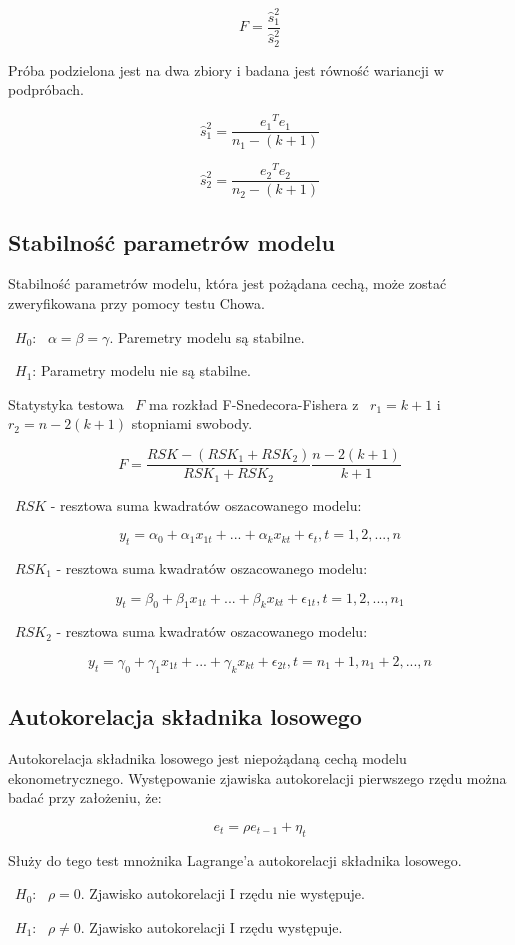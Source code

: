 \documentclass{article}
\begin{document}
\[F = \frac{\hat{s}_1^2}{\hat{s}_2^2}\]

Próba podzielona jest na dwa zbiory i badana jest równość wariancji w podpróbach.

\[\hat{s}_1^2 = \frac{{e_1}^T{e_1}}{n_1-(k+1)}\]

\[\hat{s}_2^2 = \frac{{e_2}^T{e_2}}{n_2-(k+1)}\]

\newpage
\subsection{Stabilność parametrów modelu}
Stabilność parametrów modelu, która jest pożądana cechą, może zostać zweryfikowana przy pomocy testu Chowa.

~$H_0$: ~$\alpha = \beta = \gamma$. Paremetry modelu są stabilne.

~$H_1$: Parametry modelu nie są stabilne.

Statystyka testowa ~$F$ ma rozkład F-Snedecora-Fishera z ~$r_1 = k+1$ i ~$r_2 = n - 2(k + 1)$ stopniami swobody.

\[F = \frac{RSK - (RSK_1 + RSK_2)}{RSK_1 + RSK_2}\frac{n - 2(k+1)}{k + 1}\]

~$RSK$ - resztowa suma kwadratów oszacowanego modelu:

\[y_t = \alpha_0 + \alpha_1x_{1t}+...+\alpha_kx_{kt}+\epsilon_t,t=1,2,...,n\]

~$RSK_1$ - resztowa suma kwadratów oszacowanego modelu:

\[y_t = \beta_0 + \beta_1x_{1t}+...+\beta_kx_{kt}+\epsilon_{1t},t=1,2,...,n_1\]

~$RSK_2$ - resztowa suma kwadratów oszacowanego modelu:

\[y_t = \gamma_0 + \gamma_1x_{1t}+...+\gamma_kx_{kt}+\epsilon_{2t},t=n_1+1,n_1+2,...,n\]

\subsection{Autokorelacja składnika losowego}
Autokorelacja składnika losowego jest niepożądaną cechą modelu ekonometrycznego. Występowanie zjawiska autokorelacji pierwszego rzędu można badać przy założeniu, że:

\[e_t = \rho e_{t-1}+\eta_t\]

Służy do tego test mnożnika Lagrange'a autokorelacji składnika losowego.

~$H_0$: ~$\rho=0$. Zjawisko autokorelacji I rzędu nie występuje.

~$H_1$: ~$\rho\neq0$. Zjawisko autokorelacji I rzędu występuje.
\end{document}
